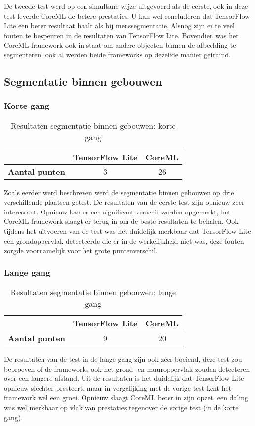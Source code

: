 De tweede test werd op een simultane wijze uitgevoerd als de eerste, ook in deze test leverde CoreML de betere prestaties. U kan wel concluderen dat TensorFlow Lite een beter resultaat haalt als bij menssegmentatie. Alsnog zijn er te veel fouten te bespeuren in de resultaten van TensorFlow Lite. Bovendien was het CoreML-framework ook in staat om andere objecten binnen de afbeelding te segmenteren, ook al werden beide frameworks op dezelfde manier getraind.
\subsection{Segmentatie binnen gebouwen}

\subsubsection{Korte gang}
\begin{table}[H]
	\centering
	\begin{tabular}{|c|c|c|}
		\hline
		& \textbf{TensorFlow Lite} & \textbf{CoreML} \\ \hline
		\textbf{Aantal punten} & 3                        & 26              \\ \hline
	\end{tabular}
	\caption{Resultaten segmentatie binnen gebouwen: korte gang}
\end{table}
Zoals eerder werd beschreven werd de segmentatie binnen gebouwen op drie verschillende plaatsen getest. De resultaten van de eerste test zijn opnieuw zeer interessant. Opnieuw kan er een significant verschil worden opgemerkt, het CoreML-framework slaagt er terug in om de beste resultaten te behalen. Ook tijdens het uitvoeren van de test was het duidelijk merkbaar dat TensorFlow Lite een grondoppervlak detecteerde die er in de werkelijkheid niet was, deze fouten zorgde voornamelijk voor het grote puntenverschil.

\subsubsection{Lange gang}
\begin{table}[H]
	\centering
	\begin{tabular}{|c|c|c|}
		\hline
		& \textbf{TensorFlow Lite} & \textbf{CoreML} \\ \hline
		\textbf{Aantal punten} & 9                        & 20              \\ \hline
	\end{tabular}
	\caption{Resultaten segmentatie binnen gebouwen: lange gang}
\end{table}
De resultaten van de test in de lange gang zijn ook zeer boeiend, deze test zou beproeven of de frameworks ook het grond -en muuroppervlak zouden detecteren over een langere afstand. Uit de resultaten is het duidelijk dat TensorFlow Lite opnieuw slechter presteert, maar in vergelijking met de vorige test kent het framework wel een groei. Opnieuw slaagt CoreML beter in zijn opzet, een daling was wel merkbaar op vlak van prestaties tegenover de vorige test (in de korte gang).

